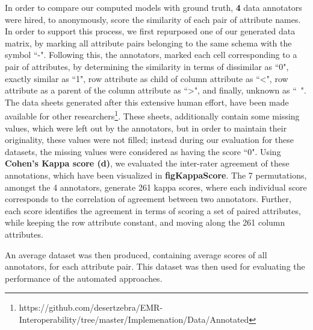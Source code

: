 In order to compare our computed models with ground truth, \textbf{4} data annotators were hired, to anonymously, score the similarity of each pair of attribute names. In order to support this process, we first repurposed one of our generated data matrix, by marking all attribute pairs belonging to the same schema with the symbol ``-". Following this, the annotators, marked each cell corresponding to a pair of attributes, by determining the similarity in terms of dissimilar as ``0", exactly similar as ``1", row attribute as child of column attribute as ``<", row attribute as a parent of the column attribute as ``>", and finally, unknown as ``~". The data sheets generated after this extensive human effort, have been made available for other researchers\footnote{https://github.com/desertzebra/EMR-Interoperability/tree/master/Implemenation/Data/Annotated}. These sheets, additionally contain some missing values, which were left out by the annotators, but in order to maintain their originality, these values were not filled; instead during our evaluation for these datasets, the missing values were considered as having the score ``0". Using \textbf{Cohen's Kappa score (d)}, we evaluated the inter-rater agreement of these annotations, which have been visualized in \textbf{figKappaScore}. The 7 permutations, amongst the 4 annotators, generate 261 kappa scores, where each individual score corresponds to the correlation of agreement between two annotators. Further, each score identifies the agreement in terms of scoring a set of paired attributes, while keeping the row attribute constant, and moving along the 261 column attributes.

An average dataset was then produced, containing average scores of all annotators, for each attribute pair. This dataset was then used for evaluating the performance of the automated approaches.

